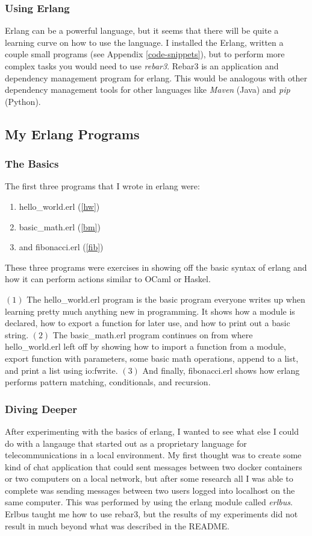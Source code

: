 \documentclass[11 pt]{IEEEtran}
\begin{document}
\subsubsection{Using Erlang}
Erlang can be a powerful language, but it seems that there will be quite a learning curve on how to use the language. I installed the Erlang, written a couple small programs (see Appendix \ref{code-snippets}), but to perform more complex tasks you would need to use \emph{rebar3}. Rebar3 is an application and dependency management program for erlang. This would be analogous with other dependency management tools for other languages like \emph{Maven} (Java) and \emph{pip} (Python).

\subsection{My Erlang Programs}\label{programs}
\subsubsection{The Basics}
The first three programs that I wrote in erlang were:
\begin{enumerate}
    \item hello\_world.erl (\ref{hw})
    \item basic\_math.erl (\ref{bm})
    \item and fibonacci.erl (\ref{fib})
\end{enumerate}
These three programs were exercises in showing off the basic syntax of erlang and how it can perform actions similar to OCaml or Haskel. 

$(1)$ The hello\_world.erl program is the basic program everyone writes up when learning pretty much anything new in programming. It shows how a module is declared, how to export a function for later use, and how to print out a basic string. $(2)$ The basic\_math.erl program continues on from where hello\_world.erl left off by showing how to import a function from a module, export function with parameters, some basic math operations, append to a list, and print a list using \textsf{io:fwrite}. $(3)$ And finally, fibonacci.erl shows how erlang performs pattern matching, conditionals, and recursion.

\subsubsection{Diving Deeper}
After experimenting with the basics of erlang, I wanted to see what else I could do with a langauge that started out as a proprietary language for telecommunications in a local environment. My first thought was to create some kind of chat application that could sent messages between two docker containers or two computers on a local network, but after some research all I was able to complete was sending messages between two users logged into localhost on the same computer. This was performed by using the erlang module called \emph{erlbus}\cite{erlbus}. Erlbus taught me how to use rebar3, but the results of my experiments did not result in much beyond what was described in the README.
\end{document}
